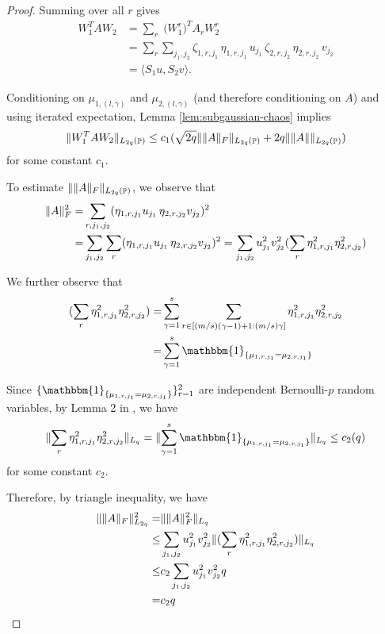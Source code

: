 \documentclass[11pt]{amsart}
\numberwithin{equation}{section}
\numberwithin{equation}{section}
\DeclareMathOperator{\Pb}{\mathbb{P}}
\DeclarePairedDelimiter{\norm}{\lVert}{\rVert}
\begin{document}
\begin{proof}
	Summing over all \(r\) gives
	\begin{align*}
		W_1^T A W_2 
		&= \sum_r \; \bigl(W_1^r\bigr)^T A_r W_2^r \\
		&= \sum_r \sum_{j_1,j_2} \zeta_{1,r,j_1}\,\eta_{1,r,j_1}\, u_{j_1} \, \zeta_{2,r,j_2}\,\eta_{2,r,j_2}\, v_{j_2} \\
		&= \langle S_1 u, S_2 v \rangle.
	\end{align*}

Conditioning on $\mu_{1,(l,\gamma)}$ and $\mu_{2,(l,\gamma)}$ (and therefore conditioning on $A$) and using iterated expectation, Lemma \ref{lem:subgaussian-chaos} implies
\begin{align*}
    \norm{W_1^T A W_2}_{L_{2q}(\Pb)} \le c_1(\sqrt{2q} \norm{\norm{A}_F}_{L_{2q}(\Pb)}+2q \norm{\norm{A}}_{L_{2q}(\Pb)})
\end{align*}
for some constant $c_1$.

To estimate $\norm{\norm{A}_F}_{L_{2q}(\Pb)}$, we observe that
\begin{align*}
    \norm{A}_F^2=&\sum_{r,j_1,j_2} (\eta_{1,r,j_1}u_{j_1} \, \eta_{2,r,j_2}v_{j_2})^2\\=&\sum_{j_1,j_2} \sum_{r} (\eta_{1,r,j_1}u_{j_1} \, \eta_{2,r,j_2}v_{j_2})^2=\sum_{j_1,j_2} u_{j_1}^2 v_{j_2}^2(\sum_{r} \eta_{1,r,j_1}^2  \eta_{2,r,j_2}^2)
\end{align*}

We further observe that
\begin{align*}
    (\sum_{r} \eta_{1,r,j_1}^2  \eta_{2,r,j_2}^2)=&\sum_{\gamma=1}^s \sum_{r \in [(m/s)(\gamma-1)+1:(m/s)\gamma]} \eta_{1,r,j_1}^2  \eta_{2,r,j_2}^2
    \\=&\sum_{\gamma=1}^s \mathbbm{1}_{\{\mu_{1,r,j_1}=\mu_{2,r,j_1}\}}
\end{align*}

Since $\{\mathbbm{1}_{\{\mu_{1,r,j_1}=\mu_{2,r,j_1}\}}\}_{r=1}^2$ are independent Bernoulli-$p$ random variables, by Lemma 2 in \cite{cohen2018simple}, we have
\begin{align*}
    \norm{\sum_{r} \eta_{1,r,j_1}^2  \eta_{2,r,j_2}^2}_{L_{q}}=\norm{\sum_{\gamma=1}^s \mathbbm{1}_{\{\mu_{1,r,j_1}=\mu_{2,r,j_1}\}}}_{L_{q}} \le c_2(q)
\end{align*}
for some constant $c_2$.

Therefore, by triangle inequality, we have
\begin{align*}
\norm{\norm{A}_F}_{L_{2q}}^2=&\norm{\norm{A}_F^2}_{L_{q}} 
\\ \le & \sum_{j_1,j_2} u_{j_1}^2 v_{j_2}^2\norm{(\sum_{r} \eta_{1,r,j_1}^2  \eta_{2,r,j_2}^2)}_{L_{q}} 
\\ \le& c_2\sum_{j_1,j_2} u_{j_1}^2 v_{j_2}^2 q
\\=&c_2q
\end{align*}


\end{proof}
\end{document}

